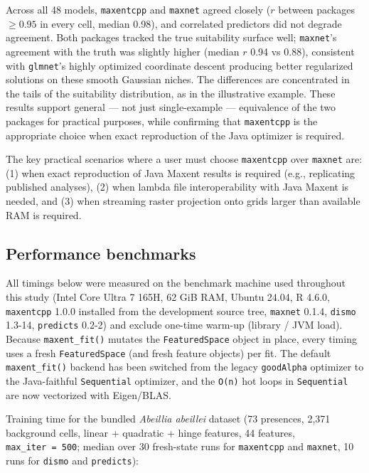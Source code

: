 \documentclass[10pt,letterpaper]{article}
\begin{document}
Across all 48 models, \texttt{maxentcpp} and \texttt{maxnet} agreed
closely (\(r\) between packages \(\ge 0.95\) in every cell, median
0.98), and correlated predictors did not degrade agreement. Both
packages tracked the true suitability surface well; \texttt{maxnet}'s
agreement with the truth was slightly higher (median \(r\) 0.94 vs
0.88), consistent with \texttt{glmnet}'s highly optimized coordinate
descent producing better regularized solutions on these smooth Gaussian
niches. The differences are concentrated in the tails of the suitability
distribution, as in the illustrative example. These results support
general --- not just single-example --- equivalence of the two packages
for practical purposes, while confirming that \texttt{maxentcpp} is the
appropriate choice when exact reproduction of the Java optimizer is
required.

The key practical scenarios where a user must choose \texttt{maxentcpp}
over \texttt{maxnet} are: (1) when exact reproduction of Java Maxent
results is required (e.g., replicating published analyses), (2) when
lambda file interoperability with Java Maxent is needed, and (3) when
streaming raster projection onto grids larger than available RAM is
required.

\subsection*{Performance benchmarks}

All timings below were measured on the benchmark machine used throughout
this study (Intel Core Ultra 7 165H, 62 GiB RAM, Ubuntu 24.04, R 4.6.0,
\texttt{maxentcpp} 1.0.0 installed from the development source tree,
\texttt{maxnet} 0.1.4, \texttt{dismo} 1.3-14, \texttt{predicts} 0.2-2)
and exclude one-time warm-up (library / JVM load). Because
\texttt{maxent\_fit()} mutates the \texttt{FeaturedSpace} object in
place, every timing uses a fresh \texttt{FeaturedSpace} (and fresh
feature objects) per fit. The default \texttt{maxent\_fit()} backend has
been switched from the legacy \texttt{goodAlpha} optimizer to the
Java-faithful \texttt{Sequential} optimizer, and the \texttt{O(n)} hot
loops in \texttt{Sequential} are now vectorized with Eigen/BLAS.

Training time for the bundled \emph{Abeillia abeillei} dataset (73
presences, 2,371 background cells, linear + quadratic + hinge features,
44 features, \texttt{max\_iter\ =\ 500}; median over 30 fresh-state runs
for \texttt{maxentcpp} and \texttt{maxnet}, 10 runs for \texttt{dismo}
and \texttt{predicts}):
\end{document}

